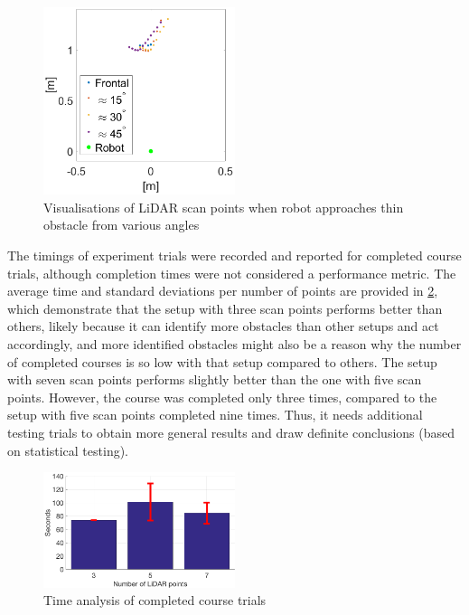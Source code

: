\begin{figure}
\centering
\includegraphics[width=0.5\textwidth]{slike/Fig04_02.png}
\caption{Visualisations of LiDAR scan points when robot approaches thin obstacle from various angles}
\label{Fig:Tocke}
\end{figure}

The timings of experiment trials were recorded and reported for completed course trials, although completion times were not considered a performance metric. The average time and standard deviations per number of points are provided in \cref{Fig:Vrimena}, which demonstrate that the setup with three scan points performs better than others, likely because it can identify more obstacles than other setups and act accordingly, and more identified obstacles might also be a reason why the number of completed courses is so low with that setup compared to others. The setup with seven scan points performs slightly better than the one with five scan points. However, the course was completed only three times, compared to the setup with five scan points completed nine times. Thus, it needs additional testing trials to obtain more general results and draw definite conclusions (based on statistical testing).

\begin{figure}
\centering
\includegraphics[width=0.5\textwidth]{slike/Fig04_03.png}
\caption{Time analysis of completed course trials}
\label{Fig:Vrimena}
\end{figure}

